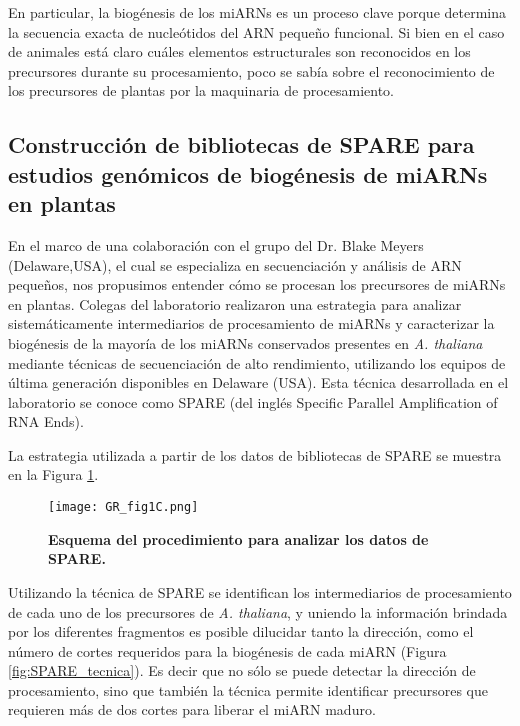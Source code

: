 En particular, la biogénesis de los miARNs es un proceso clave porque determina la secuencia exacta de nucleótidos del ARN pequeño funcional.
Si bien en el caso de animales está claro cuáles elementos estructurales son reconocidos en los precursores durante su procesamiento, poco se sabía sobre el reconocimiento de los precursores de plantas por la maquinaria de procesamiento.

\subsection{Construcción de bibliotecas de SPARE para estudios genómicos de biogénesis de miARNs en plantas}

En el marco de una colaboración con el grupo del Dr. Blake Meyers (Delaware,USA), el cual se especializa en secuenciación y análisis de ARN pequeños, nos propusimos entender cómo se procesan los precursores de miARNs en plantas. 
Colegas del laboratorio realizaron una estrategia para analizar sistemáticamente intermediarios de procesamiento de miARNs y caracterizar la biogénesis de la mayoría de los miARNs conservados presentes en \textit{A. thaliana} mediante técnicas de secuenciación de alto rendimiento, utilizando los equipos de última generación disponibles en Delaware (USA).
Esta técnica desarrollada en el laboratorio se conoce como SPARE \citep{Schapire2013} (del inglés Specific Parallel Amplification of RNA Ends).

La estrategia utilizada a partir de los datos de bibliotecas de SPARE se muestra en la Figura \ref{fig:GR_fig1C}.
 
\begin{figure}[htbp!] 
    \centering    
    \texttt{[image: GR\_fig1C.png]}
    \caption[Esquema del procedimiento para analizar los datos de SPARE]{
        \textbf{Esquema del procedimiento para analizar los datos de SPARE.}
    }
    \label{fig:GR_fig1C}
\end{figure}

Utilizando la técnica de SPARE se identifican los intermediarios de procesamiento de cada uno de los precursores de \textit{A. thaliana}, y uniendo la información brindada por los diferentes fragmentos es posible dilucidar tanto la dirección, como el número de cortes requeridos para la biogénesis de cada miARN (Figura \ref{fig:SPARE_tecnica}).
Es decir que no sólo se puede detectar la dirección de procesamiento, sino que también la técnica permite identificar precursores que requieren más de dos cortes para liberar el miARN maduro.

